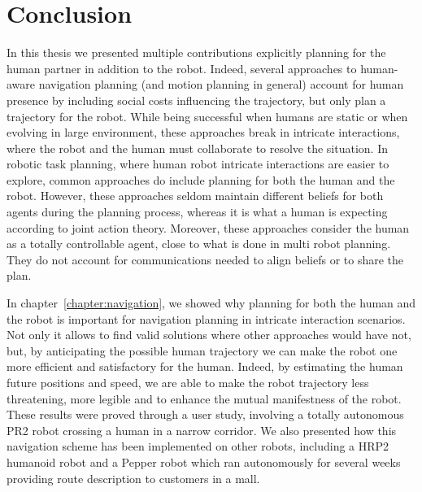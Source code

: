 \documentclass[a4paper,11pt,twoside]{StyleThese}
\begin{document}
\fi


\chapter*{Conclusion}
In this thesis we presented multiple contributions explicitly planning for the human partner in addition to the robot. Indeed, several approaches to human-aware navigation planning (and motion planning in general) account for human presence by including social costs influencing the trajectory, but only plan a trajectory for the robot. While being successful when humans are static or when evolving in large environment, these approaches break in intricate interactions, where the robot and the human must collaborate to resolve the situation. In robotic task planning, where human robot intricate interactions are easier to explore, common approaches do include planning for both the human and the robot. However, these approaches seldom maintain different beliefs for both agents during the planning process, whereas it is what a human is expecting according to joint action theory. Moreover, these approaches consider the human as a totally controllable agent, close to what is done in multi robot planning. They do not account for communications needed to align beliefs or to share the plan.

In chapter~\ref{chapter:navigation}, we showed why planning for both the human and the robot is important for navigation planning in intricate interaction scenarios. Not only it allows to find valid solutions where other approaches would have not, but, by anticipating the possible human trajectory we can make the robot one more efficient and satisfactory for the human.  Indeed, by estimating the human future positions and speed, we are able to make the robot trajectory less threatening, more legible and to enhance the mutual manifestness of the robot. These results were proved through a user study, involving a totally autonomous PR2 robot crossing a human in a narrow corridor. We also presented how this navigation scheme has been implemented on other robots, including a HRP2 humanoid robot and a Pepper robot which ran autonomously for several weeks providing route description to customers in a mall.
\end{document}
